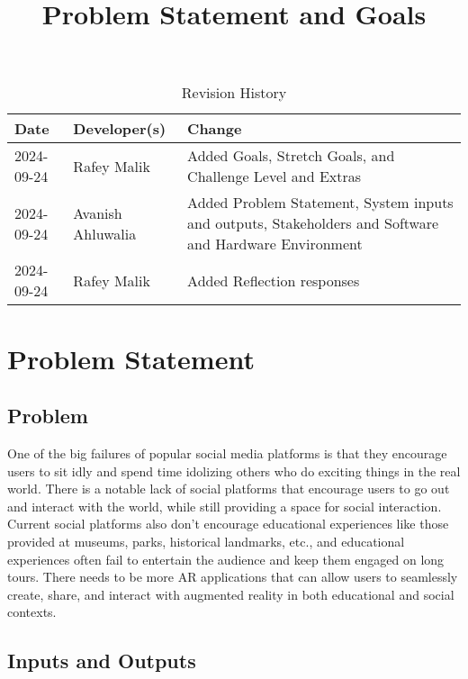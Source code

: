 \documentclass{article}
\title{Problem Statement and Goals\\\progname}
\author{\authname}
\date{}
\begin{document}
\maketitle

\begin{table}[hp]
\caption{Revision History} \label{TblRevisionHistory}
\begin{tabularx}{\textwidth}{llX}
\toprule
\textbf{Date} & \textbf{Developer(s)} & \textbf{Change}\\
\midrule
2024-09-24 & Rafey Malik & Added Goals, Stretch Goals, and Challenge Level and Extras\\
2024-09-24 & Avanish Ahluwalia & Added Problem Statement, System inputs and outputs, Stakeholders and Software and Hardware Environment\\
2024-09-24 & Rafey Malik & Added Reflection responses\\
\bottomrule
\end{tabularx}
\end{table}

\section{Problem Statement}

\subsection{Problem}
One of the big failures of popular social media platforms is that they encourage users to sit idly and spend time idolizing others who do exciting things in the real world. There is a notable lack of social platforms that encourage users to go out and interact with the world, while still providing a space for social interaction. Current social platforms also don't encourage educational experiences like those provided at museums, parks, historical landmarks, etc., and educational experiences often fail to entertain the audience and keep them engaged on long tours. There needs to be more AR applications that can allow users to seamlessly create, share, and interact with augmented reality in both educational and social contexts.\\

\subsection{Inputs and Outputs}
\end{document}
